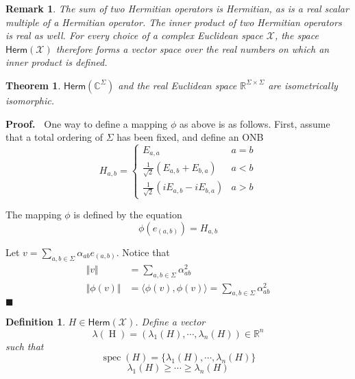 \documentclass[aps,pra,onecolumn,notitlepage,superscriptaddress]{revtex4-1}
\newcommand{\R}{\mathbb{R}}
\newcommand{\C}{\mathbb{C}}
\newcommand{\spc}[1]{\mathcal{#1}}
\newcommand{\Herm}{\mathsf{Herm}}
\def\>{\rangle}
\def\<{\langle}
\newcommand{\op}[1]{\operatorname{#1}}
\newtheorem{theo}{Theorem}
\newtheorem{defi}{Definition}
\newtheorem{rem}{Remark}
\def\Proof{{\bf Proof.~}}
\def\qed{$\blacksquare$ \newline}
\begin{document}
    \begin{rem}
        The sum of two Hermitian operators is Hermitian, as is a real scalar multiple of a Hermitian operator. The inner product of two Hermitian operators is real as well. For every choice of a complex Euclidean space $\spc X$, the space $\Herm(\spc X)$ therefore forms a vector space over the real numbers on which an inner product is defined.
    \end{rem}

    \begin{theo}
        $\Herm(\C^\Sigma)$ and the real Euclidean space $\R^{\Sigma \times \Sigma}$ are isometrically isomorphic.
    \end{theo}
    \Proof
    One way to define a mapping $\phi$ as above is as follows. First, assume that a total ordering of $\Sigma$ has been fixed, and define an ONB
    \begin{equation}
        H_{a,b} = \begin{cases}
            E_{a,a} & a=b \\
            \frac{1}{\sqrt 2} (E_{a,b} + E_{b,a}) & a < b \\
            \frac{1}{\sqrt 2} (iE_{a,b} - iE_{b,a}) & a > b
        \end{cases}
    \end{equation}

    The mapping $\phi$ is defined by the equation
    \begin{equation}
        \phi(e_{(a,b)}) = H_{a,b}
    \end{equation}

    Let $v = \sum_{a,b \in \Sigma}\alpha_{ab} e_{(a,b)}$. Notice that
    \begin{align*}
        \Vert v \Vert &= \sum_{a,b \in \Sigma} \alpha_{ab}^2 \\
        \Vert \phi(v) \Vert &= \< \phi(v), \phi(v) \> = \sum_{a,b \in \Sigma} \alpha_{ab}^2
    \end{align*}
    \qed

    \begin{defi}
        $H \in \Herm(\spc X)$. Define a vector
        \begin{equation}
            \lambda(\op H) = (\lambda_1(H), \cdots, \lambda_n(H)) \in \R^n
        \end{equation}
        such that
        \begin{equation}
            \op{spec}(H) = \{ \lambda_1(H), \cdots, \lambda_n(H) \}
        \end{equation}
        \begin{equation}
            \lambda_1(H) \geq \cdots \geq \lambda_n(H)
        \end{equation}
    \end{defi}
\end{document}
